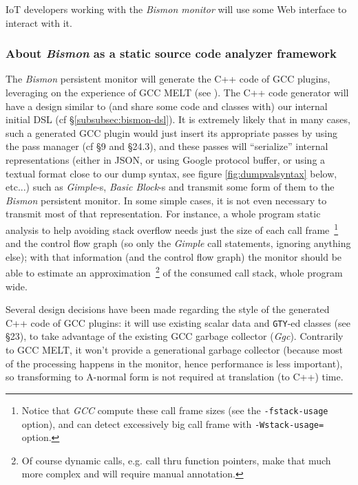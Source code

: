 IoT developers working with the \emph{Bismon monitor} will use some
Web interface to interact with it.

\subsubsection{About \emph{Bismon} as a static source code analyzer framework}

The \emph{Bismon} persistent monitor will generate the C++ code of GCC
plugins, leveraging on the experience of GCC MELT (see
\cite{Starynkevitch-DSL2011,Starynkevitch2007Multistage,Starynkevitch-GCCMELTweb}). The
C++ code generator will have a design similar to (and share some code
and classes with) our internal initial DSL (cf
§\ref{subsubsec:bismon-dsl}). It is extremely likely that in many
cases, such a generated GCC plugin would just insert its appropriate
passes by using the pass manager (cf \cite{gcc-internals} §9 and
§24.3), and these passes will ``serialize'' internal representations
(either in JSON, or using Google protocol buffer, or using a textual
format close to our dump syntax, see figure \ref{fig:dumpvalsyntax}
below, etc...)  such as \emph{Gimple}-s, \emph{Basic Block}-s and
transmit some form of them to the \emph{Bismon} persistent monitor. In
some simple cases, it is not even necessary to transmit most of that
representation. For instance, a whole program static analysis to help
avoiding stack overflow needs just the size of each call
frame~\footnote{Notice that \emph{GCC} compute these call frame sizes
  (see the \texttt{-fstack-usage} option), and can detect excessively
  big call frame with \texttt{-Wstack-usage=} option.} and the control
flow graph (so only the \emph{Gimple} call statements, ignoring
anything else); with that information (and the control flow graph)
the monitor should be able to estimate an approximation~\footnote{Of
  course dynamic calls, e.g. call thru function pointers, make that
  much more complex and will require manual annotation.} of the
consumed call stack, whole program wide.

Several design decisions have been made regarding the style of the
generated C++ code of GCC plugins: it will use existing scalar data
and \texttt{GTY}-ed classes (see \cite{gcc-internals} §23), to take
advantage of the existing GCC garbage collector
(\emph{Ggc}). Contrarily to GCC MELT, it won't provide a generational
garbage collector (because most of the processing happens in the
monitor, hence performance is less important), so transforming to
A-normal form is not required at translation (to C++) time.

